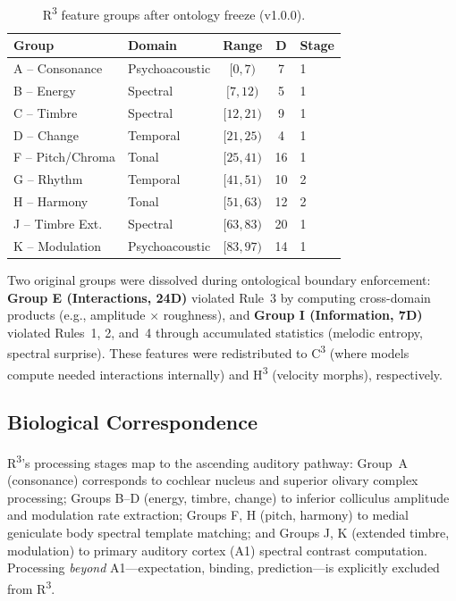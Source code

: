 \documentclass[10pt,twocolumn]{article}
\newcommand{\Rcube}{R\textsuperscript{3}}
\newcommand{\Hcube}{H\textsuperscript{3}}
\newcommand{\Ccube}{C\textsuperscript{3}}
\begin{document}
\begin{table}[!t]
\centering
\caption{\Rcube{} feature groups after ontology freeze (v1.0.0).}
\label{tab:r3groups}
\small
\begin{tabular}{@{}llccl@{}}
\toprule
\textbf{Group} & \textbf{Domain} & \textbf{Range} & \textbf{D} & \textbf{Stage} \\
\midrule
A -- Consonance   & Psychoacoustic & $[0,7)$   & 7  & 1 \\
B -- Energy       & Spectral       & $[7,12)$  & 5  & 1 \\
C -- Timbre       & Spectral       & $[12,21)$ & 9  & 1 \\
D -- Change       & Temporal       & $[21,25)$ & 4  & 1 \\
F -- Pitch/Chroma & Tonal          & $[25,41)$ & 16 & 1 \\
G -- Rhythm       & Temporal       & $[41,51)$ & 10 & 2 \\
H -- Harmony      & Tonal          & $[51,63)$ & 12 & 2 \\
J -- Timbre Ext.  & Spectral       & $[63,83)$ & 20 & 1 \\
K -- Modulation   & Psychoacoustic & $[83,97)$ & 14 & 1 \\
\bottomrule
\end{tabular}
\end{table}

Two original groups were dissolved during ontological boundary enforcement:
\textbf{Group E (Interactions, 24D)} violated Rule~3 by computing cross-domain products (e.g., amplitude $\times$ roughness), and
\textbf{Group I (Information, 7D)} violated Rules~1, 2, and~4 through accumulated statistics (melodic entropy, spectral surprise).
These features were redistributed to \Ccube{} (where models compute needed interactions internally) and \Hcube{} (velocity morphs), respectively.

\subsection{Biological Correspondence}

\Rcube{}'s processing stages map to the ascending auditory pathway:
Group~A (consonance) corresponds to cochlear nucleus and superior olivary complex processing;
Groups B--D (energy, timbre, change) to inferior colliculus amplitude and modulation rate extraction;
Groups F, H (pitch, harmony) to medial geniculate body spectral template matching;
and Groups J, K (extended timbre, modulation) to primary auditory cortex (A1) spectral contrast computation.
Processing \emph{beyond} A1---expectation, binding, prediction---is explicitly excluded from \Rcube{}.
\end{document}
